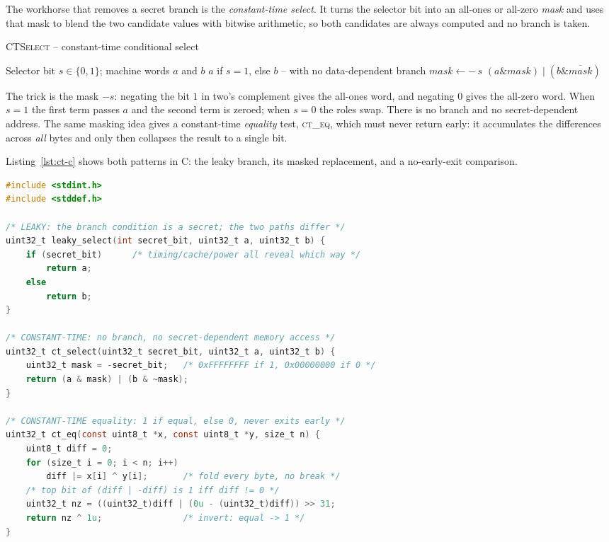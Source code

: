 The workhorse that removes a secret branch is the \emph{constant-time select}. It
turns the selector bit into an all-ones or all-zero \emph{mask} and uses that mask to
blend the two candidate values with bitwise arithmetic, so both candidates are always
computed and no branch is taken.

\begin{algorithm}[H]
\caption{\textsc{CTSelect} -- constant-time conditional select}
\label{alg:ctselect}
\begin{algorithmic}[1]
\Require Selector bit $s \in \{0,1\}$; machine words $a$ and $b$
\Ensure $a$ if $s=1$, else $b$ -- with no data-dependent branch
\State $mask \gets -\,s$
\State \Return $(a \mathbin{\&} mask) \mathbin{|} (b \mathbin{\&} \overline{mask})$
\end{algorithmic}
\end{algorithm}

The trick is the mask $-s$: negating the bit $1$ in two's complement gives the
all-ones word, and negating $0$ gives the all-zero word. When $s=1$ the first term
passes $a$ and the second term is zeroed; when $s=0$ the roles swap. There is no
branch and no secret-dependent address. The same masking idea gives a constant-time
\emph{equality} test, \textsc{ct\_eq}, which must never return early: it accumulates
the differences across \emph{all} bytes and only then collapses the result to a
single bit.

Listing~\ref{lst:ct-c} shows both patterns in C: the leaky branch, its masked
replacement, and a no-early-exit comparison.

\begin{lstlisting}[language=C,label=lst:ct-c,caption={Leaky versus constant-time patterns in C.}]
#include <stdint.h>
#include <stddef.h>

/* LEAKY: the branch condition is a secret; the two paths differ */
uint32_t leaky_select(int secret_bit, uint32_t a, uint32_t b) {
    if (secret_bit)      /* timing/cache/power all reveal which way */
        return a;
    else
        return b;
}

/* CONSTANT-TIME: no branch, no secret-dependent memory access */
uint32_t ct_select(uint32_t secret_bit, uint32_t a, uint32_t b) {
    uint32_t mask = -secret_bit;   /* 0xFFFFFFFF if 1, 0x00000000 if 0 */
    return (a & mask) | (b & ~mask);
}

/* CONSTANT-TIME equality: 1 if equal, else 0, never exits early */
uint32_t ct_eq(const uint8_t *x, const uint8_t *y, size_t n) {
    uint8_t diff = 0;
    for (size_t i = 0; i < n; i++)
        diff |= x[i] ^ y[i];       /* fold every byte, no break */
    /* top bit of (diff | -diff) is 1 iff diff != 0 */
    uint32_t nz = ((uint32_t)diff | (0u - (uint32_t)diff)) >> 31;
    return nz ^ 1u;                /* invert: equal -> 1 */
}
\end{lstlisting}

